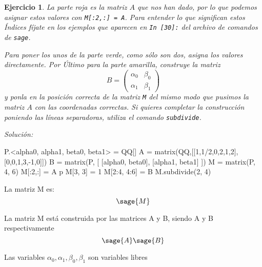 \documentclass{amsart}
\newtheorem{ejer}{Ejercicio}
\begin{document}
\begin{ejer}
La parte roja es la matriz $A$ que nos han dado, por lo que podemos asignar 
estos valores con \verb|M[:2,:] = A|. Para entender lo que significan estos Índices
fíjate en los ejemplos que aparecen en {\tt In [30]:} del archivo de comandos
de \verb|sage|.

Para poner los unos de la parte verde, como sólo son dos, asigna los valores 
directamente. Por Último para la parte amarilla, construye la matriz 
$$ B = \left(\begin{array}{cc} \alpha_0 & \beta_0 \\ \alpha_1 & \beta_1 
\end{array}\right)$$
y ponla en la posición correcta de la matriz \verb|M| del mismo modo que pusimos
la matriz $A$ con las coordenadas correctas. Si quieres completar la construcción
poniendo las líneas separadoras, utiliza el comando \verb|subdivide|.
\end{ejer}
{\it Solución: }


\begin{sageblock}
P.<alpha0, alpha1, beta0, beta1> = QQ[]
A = matrix(QQ,[[1,1/2,0,2,1,2],[0,0,1,3,-1,0]])
B = matrix(P, [ [alpha0, beta0], [alpha1, beta1] ])
M = matrix(P, 4, 6)
M[:2,:] = A
p
M[3, 3] = 1
M[2:4, 4:6] = B
M.subdivide(2, 4)
\end{sageblock}

La matriz M es: $$\sage{M}$$

La matriz M está construida por las matrices A y B, siendo A y B respectivamente $$\sage{A} \sage{B}$$

Las variables $\alpha_0,\alpha_1,\beta_0,\beta_1$ son variables libres


\end{document}
